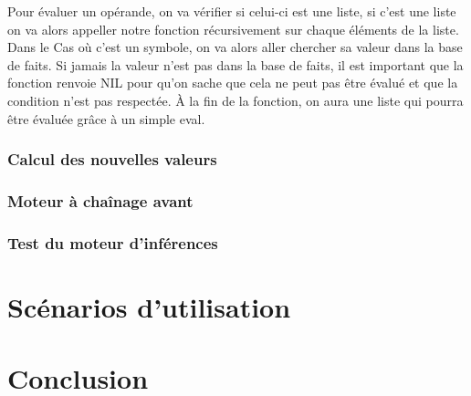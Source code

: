 \documentclass[a4paper,10pt]{report}
\begin{document}
    Pour évaluer un opérande, on va vérifier si celui-ci est une liste, si c'est une liste on va alors appeller notre fonction récursivement sur chaque éléments
    de la liste. Dans le Cas où c'est un symbole, on va alors aller chercher sa valeur dans la base de faits. Si jamais la valeur n'est pas dans la base de faits,
    il est important que la fonction renvoie NIL pour qu'on sache que cela ne peut pas être évalué et que la condition n'est pas respectée. À la fin de la fonction,
    on aura une liste qui pourra être évaluée grâce à un simple eval.\newline
    
    \subsection{Calcul des nouvelles valeurs}
    \subsection{Moteur à chaînage avant}
    \subsection{Test du moteur d'inférences}
\chapter{Scénarios d'utilisation}
\chapter*{Conclusion}

  
\end{document}
